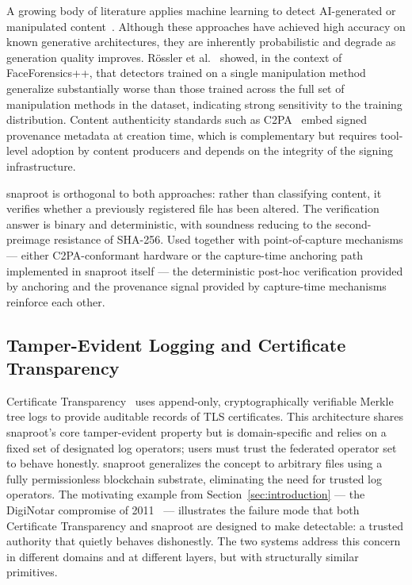 \documentclass[11pt,a4paper]{article}
\begin{document}
A growing body of literature applies machine learning to detect
AI-generated or manipulated content~\cite{rossler2019faceforensics,
li2018ictuoculi}. Although these approaches have achieved high accuracy
on known generative architectures, they are inherently probabilistic and
degrade as generation quality improves. R\"ossler et
al.~\cite{rossler2019faceforensics} showed, in the context of
FaceForensics++, that detectors trained on a single manipulation method
generalize substantially worse than those trained across the full set of
manipulation methods in the dataset, indicating strong sensitivity to
the training distribution. Content authenticity standards such as
C2PA~\cite{c2pa2023spec} embed signed provenance metadata at creation
time, which is complementary but requires tool-level adoption by content
producers and depends on the integrity of the signing infrastructure.

snaproot is orthogonal to both approaches: rather than classifying
content, it verifies whether a previously registered file has been
altered. The verification answer is binary and deterministic, with
soundness reducing to the second-preimage resistance of SHA-256. Used
together with point-of-capture mechanisms --- either C2PA-conformant
hardware or the capture-time anchoring path implemented in snaproot
itself --- the deterministic post-hoc verification provided by anchoring
and the provenance signal provided by capture-time mechanisms reinforce
each other.

\subsection{Tamper-Evident Logging and Certificate Transparency}

Certificate Transparency~\cite{laurie2013ct} uses append-only,
cryptographically verifiable Merkle tree logs to provide auditable
records of TLS certificates. This architecture shares snaproot's core
tamper-evident property but is domain-specific and relies on a fixed
set of designated log operators; users must trust the federated operator
set to behave honestly. snaproot generalizes the concept to arbitrary
files using a fully permissionless blockchain substrate, eliminating
the need for trusted log operators. The motivating example from
Section~\ref{sec:introduction} --- the DigiNotar compromise of
2011~\cite{prins2011diginotar} --- illustrates the failure mode that
both Certificate Transparency and snaproot are designed to make
detectable: a trusted authority that quietly behaves dishonestly. The
two systems address this concern in different domains and at different
layers, but with structurally similar primitives.
\end{document}
